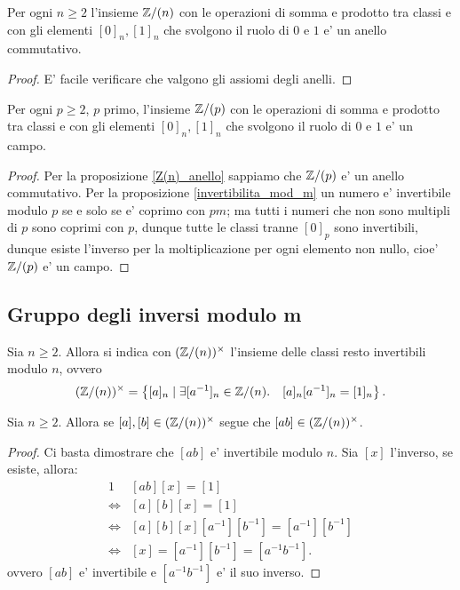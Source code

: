 \begin{proposition}\label{Z(n)_anello}
    Per ogni $n \geq 2$ l'insieme $\mathbb{Z}/(n)$ con le operazioni di somma e prodotto tra classi e con gli elementi $[0]_n, [1]_n$ che svolgono il ruolo di $0$ e $1$ e' un anello commutativo.
\end{proposition}
\begin{proof}
    E' facile verificare che valgono gli assiomi degli anelli.
\end{proof}

\begin{proposition}
    Per ogni $p \geq 2$, $p$ primo, l'insieme $\mathbb{Z}/(p)$ con le operazioni di somma e prodotto tra classi e con gli elementi $[0]_n, [1]_n$ che svolgono il ruolo di $0$ e $1$ e' un campo.
\end{proposition}
\begin{proof}
    Per la proposizione \ref{Z(n)_anello} sappiamo che $\mathbb{Z}/(p)$ e' un anello commutativo. Per la proposizione \ref{invertibilita_mod_m} un numero e' invertibile modulo $p$ se e solo se e' coprimo con $pm$; ma tutti i numeri che non sono multipli di $p$ sono coprimi con $p$, dunque tutte le classi tranne $[0]_p$ sono invertibili, dunque esiste l'inverso per la moltiplicazione per ogni elemento non nullo, cioe' $\mathbb{Z}/(p)$ e' un campo.
\end{proof}

\subsection{Gruppo degli inversi modulo m}

\begin{definition}
    Sia $n \geq 2$. Allora si indica con $(\mathbb{Z}/(n))^{\times}$ l'insieme delle classi resto invertibili modulo $n$, ovvero \begin{equation}
        (\mathbb{Z}/(n))^{\times} = \left\{[a]_n \mid \exists [a^{-1}]_n \in \mathbb{Z}/(n). \quad [a]_n[a^{-1}]_n = [1]_n\right\}.
    \end{equation} 
\end{definition}

\begin{proposition}\label{prodotto_invertibili_invertibile}
    Sia $n \geq 2$. Allora se $[a], [b] \in (\mathbb{Z}/(n))^{\times}$ segue che $[ab] \in (\mathbb{Z}/(n))^{\times}$.
\end{proposition}
\begin{proof}
    Ci basta dimostrare che $[ab]$ e' invertibile modulo $n$. Sia $[x]$ l'inverso, se esiste, allora:
    \begin{alignat*}{1}
        &[ab][x] = [1] \\
        \iff &[a][b][x] = [1] \\
        \iff &[a][b][x][a^{-1}][b^{-1}] = [a^{-1}][b^{-1}] \\
        \iff &[x] = [a^{-1}][b^{-1}] = [a^{-1}b^{-1}].
    \end{alignat*}
    ovvero $[ab]$ e' invertibile e $[a^{-1}b^{-1}]$ e' il suo inverso.
\end{proof}

